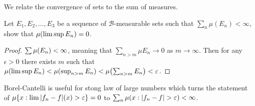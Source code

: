 We relate the convergence of sets to the sum  of measures. 
\begin{thm}
    Let \(E_{1}, E_{2},\dots,E_{3}\) be a sequence of \(\mathcal{B}\)-measurable sets such that \(\sum_{n} \mu(E_{n}) < \infty\), show that \(\mu\pqty{\limsup E_{n}} = 0\). 
\end{thm}
\begin{proof}
    \(\sum \mu \pqty{E_{n}} < \infty\), meaning that \(\sum_{n > m} \mu E_{n} \to 0\) as \(m\to \infty\). Then for any \(\epsilon>0\) there exists \(m\) such that \(\mu\pqty{\limsup E_{n}} < \mu \pqty{\sup_{n>m} E_{n}} < \mu \pqty{\sum_{n>m} E_{n}} < \epsilon\). 
\end{proof}
\begin{remark}
    Borel-Cantelli is useful for stong law of large numbers which turns the statement of \(\mu\Bqty{x: \lim \abs{f_{n} - f} (x) > \epsilon} = 0\) to \(\sum_{n} \mu\pqty{x: \abs{f_{n} - f} > \epsilon} < \infty\). 
\end{remark}
\subsection{}
